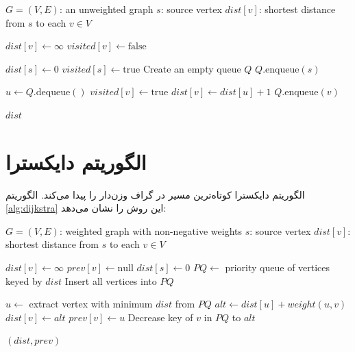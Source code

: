 \documentclass{matinbook}
\begin{document}
\begin{latin}
\begin{algorithm}
\caption{جستجوی اول سطح ()}
\label{alg:bfs}
\begin{algorithmic}[1]
    \Require $G = (V, E)$: an unweighted graph
    \Require $s$: source vertex
    \Ensure $dist[v]$: shortest distance from $s$ to each $v \in V$

        \State $dist[v] \gets \infty$
        \State $visited[v] \gets \text{false}$
    \EndFor

    \State $dist[s] \gets 0$
    \State $visited[s] \gets \text{true}$
    \State Create an empty queue $Q$
    \State $Q.\text{enqueue}(s)$

        \State $u \gets Q.\text{dequeue}()$
                \State $visited[v] \gets \text{true}$
                \State $dist[v] \gets dist[u] + 1$
                \State $Q.\text{enqueue}(v)$
            \EndIf
        \EndFor
    \EndWhile

    \State \Return $dist$
\end{algorithmic}
\end{algorithm}
\end{latin}

\section{الگوریتم دایکسترا}
\label{sec:graph-dijkstra}

الگوریتم دایکسترا کوتاه‌ترین
مسیر در گراف وزن‌دار را پیدا می‌کند. الگوریتم
\cref{alg:dijkstra} این روش را نشان می‌دهد:

\begin{latin}
\begin{algorithm}
\caption{الگوریتم دایکسترا ()}
\label{alg:dijkstra}
\begin{algorithmic}[1]
    \Require $G = (V, E)$: weighted graph with non-negative weights
    \Require $s$: source vertex
    \Ensure $dist[v]$: shortest distance from $s$ to each $v \in V$

        \State $dist[v] \gets \infty$
        \State $prev[v] \gets \text{null}$
    \EndFor
    \State $dist[s] \gets 0$
    \State $PQ \gets$ priority queue of vertices keyed by $dist$
    \State Insert all vertices into $PQ$

        \State $u \gets$ extract vertex with minimum $dist$ from $PQ$
            \State $alt \gets dist[u] + weight(u, v)$
                \State $dist[v] \gets alt$
                \State $prev[v] \gets u$
                \State Decrease key of $v$ in $PQ$ to $alt$
            \EndIf
        \EndFor
    \EndWhile

    \State \Return $(dist, prev)$
\end{algorithmic}
\end{algorithm}
\end{latin}
\end{document}
